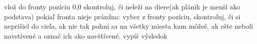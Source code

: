 \documentclass[a4paper,11pt]{article}
\begin{document}
vlož do fronty pozíciu 0,0\newline
skontroluj, či neleží na diere(ak plánik je menší ako podstava)\newline
\newline
pokiaľ fronta nieje prázdna:\newline
\newline
vyber z fronty pozíciu, skontroluj, či si neprišiel do cieľa, ak nie tak pohni sa na všetky miesta kam môžeš, ak ešte neboli navstívené a označ ich ako navšťívené.\newline
\newline
vypíš výsledok\newline
\end{document}
